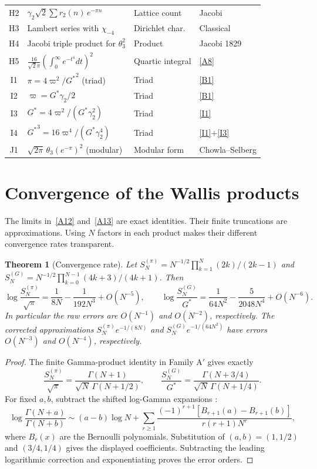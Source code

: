 \documentclass[12pt,reqno]{amsart}
\newtheorem{theorem}{Theorem}[section]
\theoremstyle{definition}
\theoremstyle{remark}
\newcommand{\Gstar}{G^{\!*}}
\newcommand{\varpiup}{\varpi}
\begin{document}
\begin{center}
\begin{longtable}{clll}
H2 & $\gamma_2\sqrt{2}\sum r_{2}(n)\,e^{-\pi n}$ & Lattice count & Jacobi \\
H3 & Lambert series with $\chi_{-4}$ & Dirichlet char.\ & Classical \\
H4 & Jacobi triple product for $\theta_3^2$ & Product & Jacobi 1829 \\
H5 & $\frac{16}{\sqrt{2}\pi}(\int_0^\infty e^{-t^4}dt)^2$ & Quartic integral & \eqref{A8} \\
\midrule
I1 & $\pi=4\varpiup^{2}/{\Gstar}^{2}$ (triad) & Triad & \eqref{B1} \\
I2 & $\varpiup={\Gstar}\gamma_{2}/2$ & Triad & \eqref{B1} \\
I3 & ${\Gstar}=4\varpiup^2/({\Gstar}\gamma_2^2)$ & Triad & \eqref{I1} \\
I4 & ${\Gstar}^{3}=16\varpiup^4/({\Gstar}\gamma_2^4)$ & Triad & \eqref{I1}$+$\eqref{I3} \\
\midrule
J1 & $\sqrt{2\pi}\,\theta_3(e^{-\pi})^2$ (modular) & Modular form & Chowla--Selberg \\
\bottomrule
\end{longtable}
\end{center}


\section{Convergence of the Wallis products}\label{sec:convergence}

The limits in~\eqref{A12} and~\eqref{A13} are exact identities.
Their finite truncations are approximations. Using $N$ factors in
each product makes their different convergence rates transparent.

\begin{theorem}[Convergence rate]\label{thm:rate}
Let $S_N^{(\pi)}=N^{-1/2}\prod_{k=1}^N(2k)/(2k-1)$ and
$S_N^{(G)}=N^{-1/2}\prod_{k=0}^{N-1}(4k+3)/(4k+1)$. Then
\[
 \log\frac{S_N^{(\pi)}}{\sqrt\pi}
   =\frac1{8N}-\frac1{192N^3}+O(N^{-5}),\qquad
 \log\frac{S_N^{(G)}}{\Gstar}
   =\frac1{64N^2}-\frac5{2048N^4}+O(N^{-6}).
\]
In particular the raw errors are $O(N^{-1})$ and $O(N^{-2})$,
respectively. The corrected approximations
$S_N^{(\pi)}e^{-1/(8N)}$ and $S_N^{(G)}e^{-1/(64N^2)}$
have errors $O(N^{-3})$ and $O(N^{-4})$, respectively.
\end{theorem}

\begin{proof}
The finite Gamma-product identity in Family A$'$ gives exactly
\[
 \frac{S_N^{(\pi)}}{\sqrt\pi}
 =\frac{\Gamma(N+1)}{\sqrt N\,\Gamma(N+1/2)},\qquad
 \frac{S_N^{(G)}}{\Gstar}
 =\frac{\Gamma(N+3/4)}{\sqrt N\,\Gamma(N+1/4)}.
\]
For fixed $a,b$, subtract the shifted log-Gamma expansions
\cite[5.11.8]{DLMF}:
\[
 \log\frac{\Gamma(N+a)}{\Gamma(N+b)}
 \sim(a-b)\log N+
 \sum_{r\geq1}\frac{(-1)^{r+1}
 [B_{r+1}(a)-B_{r+1}(b)]}{r(r+1)N^r},
\]
where $B_r(x)$ are the Bernoulli polynomials. Substitution of
$(a,b)=(1,1/2)$ and $(3/4,1/4)$ gives the displayed coefficients.
Subtracting the leading logarithmic correction and exponentiating
proves the error orders.
\end{proof}
\end{document}
